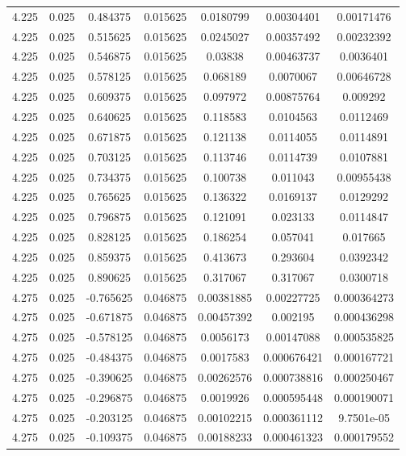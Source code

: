 \begin{table}[bh]
\begin{center}
{\begin{tabular}{ccccccc}
4.225	 & 0.025 & 	0.484375	 & 0.015625	 & 0.0180799	 & 0.00304401	 & 0.00171476 \\ 
4.225	 & 0.025 & 	0.515625	 & 0.015625	 & 0.0245027	 & 0.00357492	 & 0.00232392 \\ 
4.225	 & 0.025 & 	0.546875	 & 0.015625	 & 0.03838	 & 0.00463737	 & 0.0036401 \\ 
4.225	 & 0.025 & 	0.578125	 & 0.015625	 & 0.068189	 & 0.0070067	 & 0.00646728 \\ 
4.225	 & 0.025 & 	0.609375	 & 0.015625	 & 0.097972	 & 0.00875764	 & 0.009292 \\ 
4.225	 & 0.025 & 	0.640625	 & 0.015625	 & 0.118583	 & 0.0104563	 & 0.0112469 \\ 
4.225	 & 0.025 & 	0.671875	 & 0.015625	 & 0.121138	 & 0.0114055	 & 0.0114891 \\ 
4.225	 & 0.025 & 	0.703125	 & 0.015625	 & 0.113746	 & 0.0114739	 & 0.0107881 \\ 
4.225	 & 0.025 & 	0.734375	 & 0.015625	 & 0.100738	 & 0.011043	 & 0.00955438 \\ 
4.225	 & 0.025 & 	0.765625	 & 0.015625	 & 0.136322	 & 0.0169137	 & 0.0129292 \\ 
4.225	 & 0.025 & 	0.796875	 & 0.015625	 & 0.121091	 & 0.023133	 & 0.0114847 \\ 
4.225	 & 0.025 & 	0.828125	 & 0.015625	 & 0.186254	 & 0.057041	 & 0.017665 \\ 
4.225	 & 0.025 & 	0.859375	 & 0.015625	 & 0.413673	 & 0.293604	 & 0.0392342 \\ 
4.225	 & 0.025 & 	0.890625	 & 0.015625	 & 0.317067	 & 0.317067	 & 0.0300718 \\ 
4.275	 & 0.025 & 	-0.765625	 & 0.046875	 & 0.00381885	 & 0.00227725	 & 0.000364273 \\ 
4.275	 & 0.025 & 	-0.671875	 & 0.046875	 & 0.00457392	 & 0.002195	 & 0.000436298 \\ 
4.275	 & 0.025 & 	-0.578125	 & 0.046875	 & 0.0056173	 & 0.00147088	 & 0.000535825 \\ 
4.275	 & 0.025 & 	-0.484375	 & 0.046875	 & 0.0017583	 & 0.000676421	 & 0.000167721 \\ 
4.275	 & 0.025 & 	-0.390625	 & 0.046875	 & 0.00262576	 & 0.000738816	 & 0.000250467 \\ 
4.275	 & 0.025 & 	-0.296875	 & 0.046875	 & 0.0019926	 & 0.000595448	 & 0.000190071 \\ 
4.275	 & 0.025 & 	-0.203125	 & 0.046875	 & 0.00102215	 & 0.000361112	 & 9.7501e-05 \\ 
4.275	 & 0.025 & 	-0.109375	 & 0.046875	 & 0.00188233	 & 0.000461323	 & 0.000179552 \\ 

\end{tabular}}
\end{center}
\end{table}
